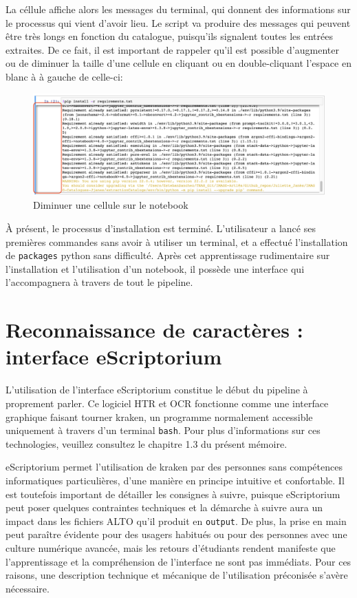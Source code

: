 \documentclass[a4paper,12pt,twoside]{book}
\begin{document}
La céllule affiche alors les messages du terminal, qui donnent des informations sur le processus qui vient d'avoir lieu. Le script va produire des messages qui peuvent être très longs en fonction du catalogue, puisqu'ils signalent toutes les entrées extraites. De ce fait, il est important de rappeler qu'il est possible d'augmenter ou de diminuer la taille d'une cellule en cliquant ou en double-cliquant l'espace en blanc à à gauche de celle-ci:

\begin{figure}[ht]
	\centering
	\includegraphics[scale=0.3]{cellule_diminuer.png}		
	\caption{Diminuer une cellule sur le notebook}
\end{figure}

À présent, le processus d'installation est terminé. L'utilisateur a lancé ses premières commandes sans avoir à utiliser un terminal, et a effectué l'installation de \texttt{packages} python sans difficulté. Après cet apprentissage rudimentaire sur l'installation et l'utilisation d'un notebook, il possède une interface qui l'accompagnera à travers de tout le pipeline.




	\chapter{Reconnaissance de caractères : interface eScriptorium}
	

	

L'utilisation de l'interface eScriptorium constitue le début du pipeline à proprement parler. Ce logiciel HTR et OCR fonctionne comme une interface graphique faisant tourner kraken, un programme normalement accessible uniquement à travers d'un terminal \texttt{bash}. Pour plus d'informations sur ces technologies, veuillez consultez le chapitre 1.3 du présent mémoire.

eScriptorium permet l'utilisation de kraken par des personnes sans compétences informatiques particulières, d'une manière en principe intuitive et confortable. Il est toutefois important de détailler les consignes à suivre, puisque eScriptorium peut poser quelques contraintes techniques et la démarche à suivre aura un impact dans les fichiers ALTO qu'il produit en \texttt{output}. De plus, la prise en main peut paraître évidente pour des usagers habitués ou pour des personnes avec une culture numérique avancée, mais les retours d'étudiants rendent manifeste que l'apprentissage et la compréhension de l'interface ne sont pas immédiats. Pour ces raisons, une description technique et mécanique de l'utilisation préconisée s'avère nécessaire.
\end{document}
